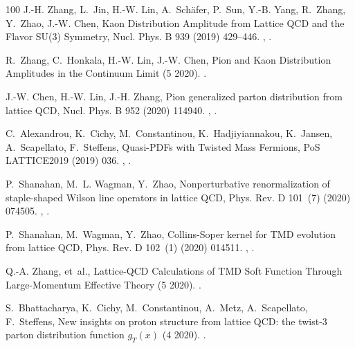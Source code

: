 \begin{thebibliography}{100}
J.-H. Zhang, L.~Jin, H.-W. Lin, A.~Sch\"afer, P.~Sun, Y.-B. Yang, R.~Zhang,
  Y.~Zhao, J.-W. Chen, {Kaon Distribution Amplitude from Lattice QCD and the
  Flavor SU(3) Symmetry}, Nucl. Phys. B 939 (2019) 429--446.
\newblock \href {http://arxiv.org/abs/1712.10025} {},
  \href {https://doi.org/10.1016/j.nuclphysb.2018.12.020}
  {}.

R.~Zhang, C.~Honkala, H.-W. Lin, J.-W. Chen, {Pion and Kaon Distribution
  Amplitudes in the Continuum Limit} (5 2020).
\newblock \href {http://arxiv.org/abs/2005.13955} {}.

J.-W. Chen, H.-W. Lin, J.-H. Zhang, {Pion generalized parton distribution from
  lattice QCD}, Nucl. Phys. B 952 (2020) 114940.
\newblock \href {http://arxiv.org/abs/1904.12376} {},
  \href {https://doi.org/10.1016/j.nuclphysb.2020.114940}
  {}.

C.~Alexandrou, K.~Cichy, M.~Constantinou, K.~Hadjiyiannakou, K.~Jansen,
  A.~Scapellato, F.~Steffens, {Quasi-PDFs with Twisted Mass Fermions}, PoS
  LATTICE2019 (2019) 036.
\newblock \href {http://arxiv.org/abs/1910.13229} {},
  \href {https://doi.org/10.22323/1.363.0036} {}.

P.~Shanahan, M.~L. Wagman, Y.~Zhao, {Nonperturbative renormalization of
  staple-shaped Wilson line operators in lattice QCD}, Phys. Rev. D 101~(7)
  (2020) 074505.
\newblock \href {http://arxiv.org/abs/1911.00800} {},
  \href {https://doi.org/10.1103/PhysRevD.101.074505}
  {}.

P.~Shanahan, M.~Wagman, Y.~Zhao, {Collins-Soper kernel for TMD evolution from
  lattice QCD}, Phys. Rev. D 102~(1) (2020) 014511.
\newblock \href {http://arxiv.org/abs/2003.06063} {},
  \href {https://doi.org/10.1103/PhysRevD.102.014511}
  {}.

Q.-A. Zhang, et~al., {Lattice-QCD Calculations of TMD Soft Function Through
  Large-Momentum Effective Theory} (5 2020).
\newblock \href {http://arxiv.org/abs/2005.14572} {}.

S.~Bhattacharya, K.~Cichy, M.~Constantinou, A.~Metz, A.~Scapellato,
  F.~Steffens, {New insights on proton structure from lattice QCD: the twist-3
  parton distribution function $g_T(x)$} (4 2020).
\newblock \href {http://arxiv.org/abs/2004.04130} {}.


\end{thebibliography}
